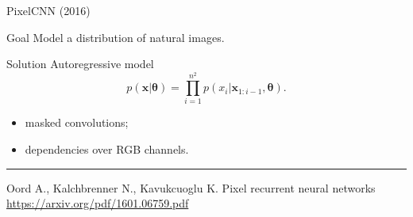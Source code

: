 \documentclass{beamer}
\newcommand{\bx}{\mathbf{x}}
\newcommand{\btheta}{\boldsymbol{\theta}}
\begin{document}
\begin{frame}{PixelCNN (2016)}
\begin{block}{Goal}
Model a distribution of natural images.
\end{block}
\begin{block}{Solution}
Autoregressive model
\[
    p(\bx | \btheta) = \prod_{i=1}^{n^2} p(x_i|\bx_{1:i-1}, \btheta).
\]
\begin{itemize}
    \item masked convolutions;
    \item dependencies over RGB channels.
\end{itemize}
\end{block}
\vfill
\hrule\medskip
{\scriptsize Oord A., Kalchbrenner N., Kavukcuoglu K. Pixel recurrent neural networks \href{https://arxiv.org/pdf/1601.06759.pdf}{https://arxiv.org/pdf/1601.06759.pdf}}
\end{frame}
\end{document}
